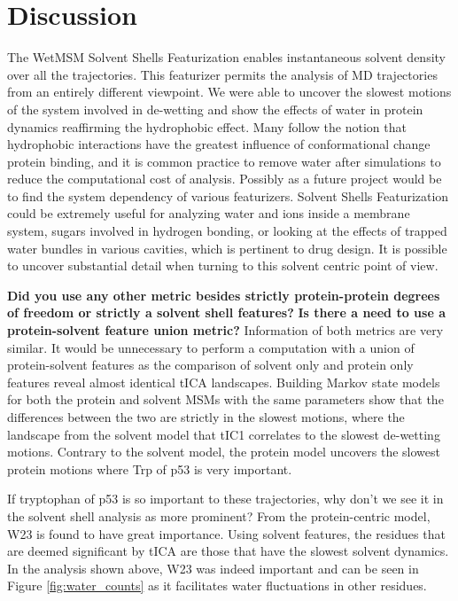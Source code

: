 

\section{Discussion}



The WetMSM Solvent Shells Featurization enables instantaneous solvent density over all the trajectories.  This featurizer permits the analysis of MD trajectories from an entirely different viewpoint. We were able to uncover the slowest motions of the system involved in de-wetting and show the effects of water in protein dynamics reaffirming the hydrophobic effect.  Many follow the notion that hydrophobic interactions have the greatest influence of conformational change protein binding, and it is common practice to remove water after simulations to reduce the computational cost of analysis.
Possibly as a future project would be to find the system dependency of various featurizers.
Solvent Shells Featurization could be extremely useful for analyzing water and ions inside a membrane system, sugars involved in hydrogen bonding, or looking at the effects of trapped water bundles in various cavities, which is pertinent to drug design.  It is possible to  uncover substantial detail when turning to this solvent centric point of view.

\textbf{Did you use any other metric besides strictly protein-protein degrees of freedom or strictly a solvent shell features?} \textbf{Is there a need to use a protein-solvent feature union metric?} Information of both metrics are very similar. It would be unnecessary to perform a computation with a union of protein-solvent features as the comparison of solvent only and protein only features reveal almost identical tICA landscapes. Building Markov state models for both the protein and solvent MSMs with the same parameters show that the differences between the two are strictly in the slowest motions, where the landscape from the solvent model that tIC1 correlates to the slowest de-wetting motions. Contrary to the solvent model, the protein model uncovers the slowest protein motions where Trp of p53 is very important.


If tryptophan of p53 is so important to these trajectories, why don't we see it in the solvent shell analysis as more prominent?  From the protein-centric model, W23 is found to have great importance.  Using solvent features, the residues that are deemed significant by tICA are those that have the slowest solvent dynamics.  In the analysis shown above, W23 was indeed important and can be seen in Figure \ref{fig:water_counts} as it facilitates water fluctuations in other residues.







